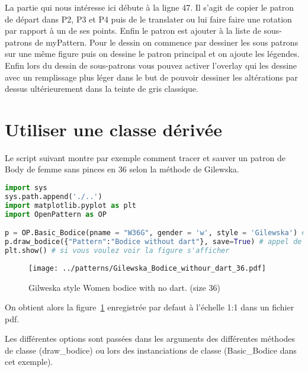 \documentclass[11pt,a4paper]{report}
\begin{document}
La partie qui nous intéresse ici débute à la ligne 47. Il s'agit de copier le patron de départ dans P2, P3 et P4 puis de le translater ou lui faire faire une rotation par rapport à un de ses points. Enfin le patron est ajouter à la liste de sous-patrons de myPattern. Pour le dessin on commence par dessiner les sous patrons sur une même figure puis on dessine le patron principal et on ajoute les légendes. Enfin lors du dessin de sous-patrons vous pouvez activer l'overlay qui les dessine avec un remplissage plus léger dans le but de pouvoir dessiner les altérations par dessus ultérieurement dans la teinte de gris classique.





\section{Utiliser une classe dérivée}

Le script suivant montre par exemple comment tracer et sauver un patron de Body de femme sans pinces en 36 selon la méthode de Gilewska.
\begin{lstlisting}[language=python]
import sys
sys.path.append('./..')
import matplotlib.pyplot as plt
import OpenPattern as OP

p = OP.Basic_Bodice(pname = "W36G", gender = 'w', style = 'Gilewska') # Creation de l'instance
p.draw_bodice({"Pattern":"Bodice without dart"}, save=True) # appel de la fonction de dessin
plt.show() # si vous voulez voir la figure s'afficher
\end{lstlisting}

\begin{figure}[hbtp]
\centering
\texttt{[image: ../patterns/Gilewska\_Bodice\_withour\_dart\_36.pdf]}
\caption{Gilweska style Women bodice with no dart. (size 36)}
\label{fig:bodice_WG36}
\end{figure}

On obtient alors la figure~\ref{fig:bodice_WG36} enregistrée par defaut à l'échelle 1:1 dans un fichier pdf.


Les différentes options sont passées dans les arguments des différentes méthodes de classe (draw\_bodice) ou lors des instanciations de classe (Basic\_Bodice dans cet exemple).
\end{document}
